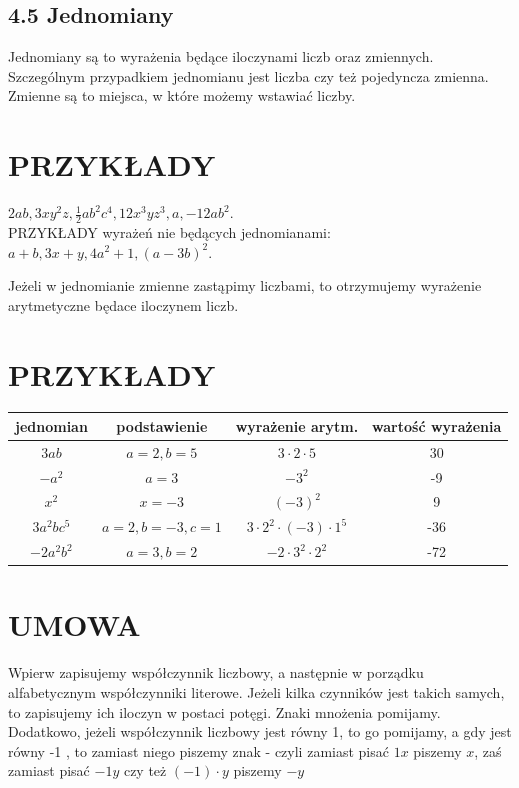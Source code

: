 \documentclass[10pt]{article}
\begin{document}
\subsection*{4.5 Jednomiany}
Jednomiany są to wyrażenia będące iloczynami liczb oraz zmiennych. Szczególnym przypadkiem jednomianu jest liczba czy też pojedyncza zmienna. Zmienne są to miejsca, w które możemy wstawiać liczby.

\section*{PRZYKŁADY}
\(2 a b, 3 x y^{2} z, \frac{1}{2} a b^{2} c^{4}, 12 x^{3} y z^{3}, a,-12 a b^{2}\).\\
PRZYKŁADY wyrażeń nie będących jednomianami:\\
\(a+b, 3 x+y, 4 a^{2}+1,(a-3 b)^{2}\).

Jeżeli w jednomianie zmienne zastąpimy liczbami, to otrzymujemy wyrażenie arytmetyczne będace iloczynem liczb.

\section*{PRZYKŁADY}
\begin{center}
\begin{tabular}{c|c|c|c}
jednomian & podstawienie & wyrażenie arytm. & wartość wyrażenia \\
\hline
\(3 a b\) & \(a=2, b=5\) & \(3 \cdot 2 \cdot 5\) & 30 \\
\(-a^{2}\) & \(a=3\) & \(-3^{2}\) & -9 \\
\(x^{2}\) & \(x=-3\) & \((-3)^{2}\) & 9 \\
\(3 a^{2} b c^{5}\) & \(a=2, b=-3, c=1\) & \(3 \cdot 2^{2} \cdot(-3) \cdot 1^{5}\) & -36 \\
\(-2 a^{2} b^{2}\) & \(a=3, b=2\) & \(-2 \cdot 3^{2} \cdot 2^{2}\) & -72 \\
\end{tabular}
\end{center}

\section*{UMOWA}
Wpierw zapisujemy współczynnik liczbowy, a następnie w porządku alfabetycznym współczynniki literowe. Jeżeli kilka czynników jest takich samych, to zapisujemy ich iloczyn w postaci potęgi. Znaki mnożenia pomijamy. Dodatkowo, jeżeli współczynnik liczbowy jest równy 1, to go pomijamy, a gdy jest równy -1 , to zamiast niego piszemy znak - czyli zamiast pisać \(1 x\) piszemy \(x\), zaś zamiast pisać \(-1 y\) czy też \((-1) \cdot y\) piszemy \(-y\)
\end{document}
